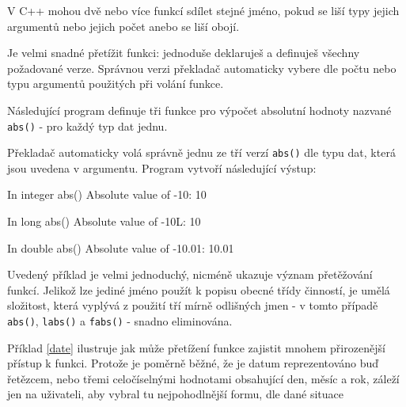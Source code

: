       V C++ mohou dvě nebo více funkcí sdílet stejné jméno, pokud se liší typy jejich argumentů 
      nebo jejich počet anebo se liší obojí.
  
      Je velmi snadné přetížit funkci: jednoduše deklaruješ a definuješ všechny požadované verze. 
      Správnou verzi překladač automaticky vybere dle počtu nebo typu argumentů použitých při 
      volání funkce.
  
      \begin{example}
        Následující program definuje tři funkce pro výpočet absolutní hodnoty nazvané 
        \lstinline[basicstyle=\ttfamily]!abs()! - pro každý typ dat jednu.
        
        \end{example}
  
        Překladač automaticky volá správně jednu ze tří verzí 
        \lstinline[basicstyle=\ttfamily]!abs()! dle typu dat, která jsou uvedena v argumentu. 
        Program vytvoří následující výstup:
        \begin{center}
          In integer abs()
          Absolute value of -10: 10
    
          In long abs()
          Absolute value of -10L: 10
    
          In double abs()
          Absolute value of -10.01: 10.01
        \end{center}
  
        Uvedený příklad je velmi jednoduchý, nicméně ukazuje význam přetěžování funkcí. Jelikož lze 
        jediné jméno použít k popisu obecné třídy činností, je umělá složitost, která vyplývá z 
        použití tří mírně odlišných jmen - v tomto případě \lstinline[basicstyle=\ttfamily]!abs()!, 
        \lstinline[basicstyle=\ttfamily]!labs()! a \lstinline[basicstyle=\ttfamily]!fabs()! - 
        snadno eliminována.
  
        \begin{example}\label{date}
        
        \end{example}
  
      Příklad \ref{date} ilustruje jak může přetížení funkce zajistit mnohem při\-rozenější přístup 
      k funkci. Protože je poměrně běžné, že je datum reprezentováno buď řetězcem, nebo třemi 
      celočíselnými hodnotami obsahující den, měsíc a rok, záleží jen na uživateli, aby vybral tu 
      nejpohodlnější formu, dle dané situace
  
